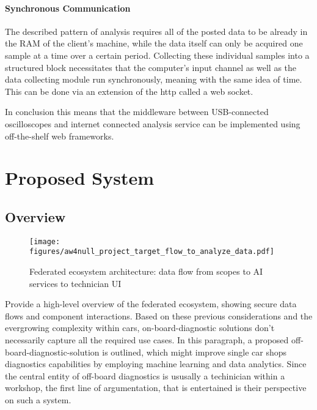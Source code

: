 \paragraph{Synchronous Communication}
The described pattern of analysis requires all of the posted data to be already in the RAM of the client’s machine, while the data itself can only be acquired one sample at a time over a certain period. 
Collecting these individual samples into a structured block necessitates that the computer’s input channel as well as the data collecting module run synchronously, meaning with the same idea of time. 
This can be done via an extension of the http called a web socket.

In conclusion this means that the middleware between USB-connected oscilloscopes and internet connected analysis service can be implemented using off-the-shelf web frameworks.

\section{Proposed System}
\subsection{Overview}
\begin{figure}[ht]
  \centering
  \texttt{[image: figures/aw4null\_project\_target\_flow\_to\_analyze\_data.pdf]}
  \caption{Federated ecosystem architecture: data flow from scopes to AI services to technician UI}
  \label{fig:system_architecture}
\end{figure}
Provide a high-level overview of the federated ecosystem, showing secure data flows and component interactions.
Based on these previous considerations and the evergrowing complexity within cars, on-board-diagnostic solutions don't necessarily capture all the required use cases.
In this paragraph, a proposed off-board-diagnostic-solution is outlined, which might improve single car shops diagnostics capabilities by employing machine learning and data analytics.
Since the central entity of off-board diagnostics is ususally a techinician within a workshop, the first line of argumentation, that is entertained is their perspective on such a system.

